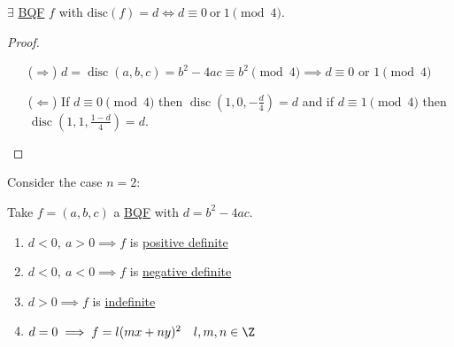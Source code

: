 \documentclass{article}
\DeclareMathOperator{\disc}{disc}
\begin{document}
\begin{nlemma}\label{lem:4.3}
    $\exists$ \hyperlink{def:bqf}{BQF} $f$ with $\mathrm{disc}(f) = d \iff d \equiv 0 \ \text{or}\ 1 \pmod{4}$.
\end{nlemma}
\begin{proof}
    \begin{itemize}
        \item[($\Rightarrow$)] $d = \disc(a, b, c) = b^2 - 4ac \equiv b^2 \pmod{4} \implies d \equiv 0 \text{ or } 1 \pmod{4}$
        \item [($\Leftarrow$)] If $d \equiv 0 \pmod{4}$ then $\disc(1,0,-\frac{d}{4}) = d$ and if $d \equiv 1 \pmod{4}$ then $\disc(1,1,\frac{1-d}{4})=d$.
    \end{itemize}
\end{proof}



Consider the case $n = 2$:

\begin{nlemma}\label{lem:4.4}
    Take $f=(a,b,c)$ a \hyperlink{def:bqf}{BQF} with $d = b^2 - 4ac$.
    \begin{enumerate}[label=(\roman*)]
        \item $d<0,\ a>0 \implies f$ is \hyperlink{def:definite}{positive definite}
        \item $d<0,\ a<0 \implies f$ is \hyperlink{def:definite}{negative definite}
        \item $d>0 \implies f$ is \hyperlink{def:definite}{indefinite}
        \item $d=0 \implies f = l(m x + ny)^2 \quad l,m,n \in \Z$
    \end{enumerate}
\end{nlemma}
\end{document}

